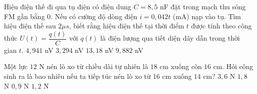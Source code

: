 \begin{ex}%
	Hiệu điện thế đi qua tụ điện có điện dung $C=8,5$ nF đặt trong mạch thu sóng FM gần bằng $0$. Nếu có cường độ dòng điện $i=0{,}042t$ (mA) nạp vào tụ. Tìm hiệu điện thế sau $2\mu s$, biết rằng hiệu điện thế tại thời điểm $t$ được tính theo công thức $U(t)=\dfrac{q(t)}{C}$ với $q(t)$ là điện lượng qua tiết diện dây dẫn trong thời gian $t$. 
	\choice
	{$4{,}941$ nV}
	{$3{,}294$ nV}
	{$13{,}18$ nV}
	{\True $9{,}882$ nV}
\end{ex}
\begin{ex}%
	Một lực $12$ N nén lò xo từ chiều dài tự nhiên là $18$ cm xuống còn $16$ cm. Hỏi công sinh ra là bao nhiêu nếu ta tiếp túc nén lò xo từ $16$ cm xuống $14$ cm?
	\choice
	{\True $3{,}6$ N}
	{$1{,}8$ N}
	{$0{,}9$ N}
	{$1{,}2$ N}
\end{ex}
